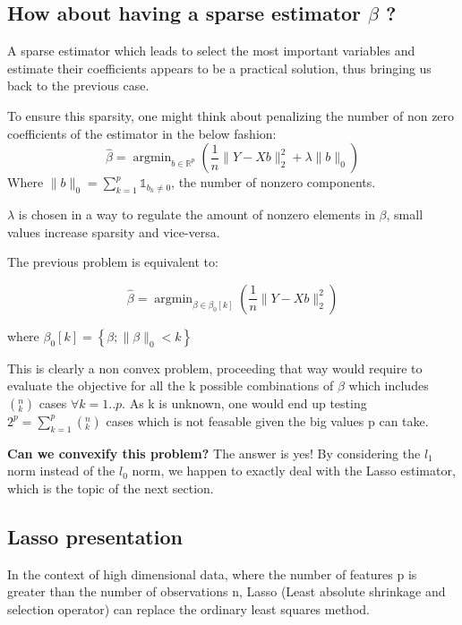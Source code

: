 \documentclass[10pt,onecolumn,letterpaper]{article}
\DeclareMathOperator*{\argmin}{argmin}
\begin{document}
\subsection{How about having a sparse estimator $\beta$ ?}

A sparse estimator which leads to select the most important variables and estimate their coefficients appears to be a practical solution, thus bringing us back to the previous case.

To ensure this sparsity, one might think about penalizing the number of non zero coefficients of the estimator in the below fashion:
$$
\hat{\beta} = \argmin_{b \in \mathbb{R}^p} \left( \frac{1}{n}\lVert Y - Xb \rVert_2^2 + \lambda \lVert b \rVert_0 \right )
$$
Where $\lVert b \rVert_0 = \sum_{k=1}^p \mathds{1}_{b_k \neq 0}$, the number of  nonzero components. 

$\lambda$ is chosen in a way to regulate the amount of nonzero elements in $\beta$, small values increase sparsity and vice-versa.

The previous problem is equivalent to:

$$
\hat{\beta} = \argmin_{\beta \in \beta_0[k]} \left( \frac{1}{n}\lVert Y - Xb \rVert_2^2 \right )
$$

where $\beta_0[k] = \left\{\beta;  \lVert \beta \rVert_0 < k\right\}$ 
\newline


This is clearly a non convex problem, proceeding that way would require to evaluate the objective for all the k possible combinations of $\beta$ which includes $\left( ^n_k\right) $ cases $\forall k = 1..p$. As k is unknown, one would end up testing $2^p = \sum_{k=1}^p \left( ^n_k\right)$ cases which is not feasable given the big values p can take.
\newline


\textbf{Can we convexify this problem?}
The answer is yes! By considering the $l_1$ norm instead of the $l_0$ norm, we happen to exactly deal with the Lasso estimator, which is the topic of the next section.

\subsection{Lasso presentation }

In the context of high dimensional data, where the number of features p is greater than the number of observations n, Lasso (Least absolute shrinkage and selection operator) can replace the ordinary least squares method.
\end{document}
